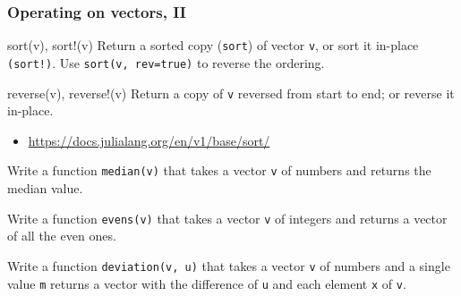 \documentclass[english,serif,mathserif,xcolor=pdftex,dvipsnames,table]{beamer}
\begin{document}
\begin{frame}
  \frametitle{Operating on vectors, II}


\begin{describe}{\ttfamily sort(v), sort!(v)}
  Return a sorted copy (\texttt{sort}) of vector \texttt{v}, or sort
  it in-place \texttt{(sort!)}.  Use \texttt{sort(v, rev=true)} to
  reverse the ordering.
\end{describe}

  \begin{describe}{\ttfamily reverse(v), reverse!(v)}
    Return a copy of \texttt{v} reversed from start to end;
    or reverse it in-place.
  \end{describe}


  \+
  \begin{references}
    \begin{itemize}
    \item \url{https://docs.julialang.org/en/v1/base/sort/}
  \end{itemize}
  \end{references}
\end{frame}


\begin{frame}
  \begin{exercise*}[3.E]
    Write a function \texttt{median(v)} that takes a vector \texttt{v}
    of numbers and returns the median value.
  \end{exercise*}

  \+
  \begin{exercise*}[3.F]
    Write a function \texttt{evens(v)} that takes a vector \texttt{v} of
    integers and returns a vector of all the even ones.
  \end{exercise*}

  \+
  \begin{exercise*}[3.G]
    Write a function \texttt{deviation(v, u)} that takes a vector \texttt{v} of
    numbers and a single value \texttt{m} returns a vector with the difference of
    \texttt{u} and each element \texttt{x} of \texttt{v}.
  \end{exercise*}
\end{frame}
\end{document}
